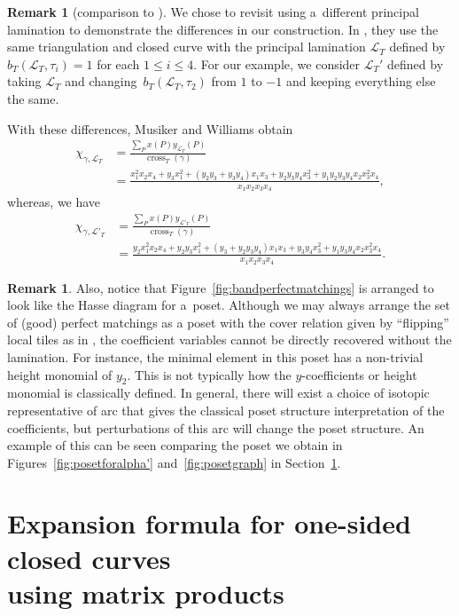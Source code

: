 \documentclass[pdftex]{sigma}
\numberwithin{equation}{section}
\theoremstyle{definition}
\newtheorem{Remark}[Theorem]{Remark}
\begin{document}
\begin{Remark}[{comparison to \cite[Example~3.23]{MW13}}] We chose to revisit \cite[Example 3.23]{MW13} using a~different principal lamination to demonstrate the differences in our construction. In \cite{MW13}, they use the same triangulation and closed curve with the principal lamination $\mathcal{L}_T$ defined by~$b_T(\mathcal{L}_T, \tau_{i})=1$ for each $1\leq i\leq 4$. For our example, we consider $\mathcal{L}_T'$ defined by taking $\mathcal{L}_T$ and changing~$b_T(\mathcal{L}_T, \tau_2)$ from $1$ to $-1$ and keeping everything else the same.

With these differences, Musiker and Williams obtain
\begin{align*}
\chi_{\gamma, \mathcal{L}_T}&=\frac{\sum_P x(P)y_{\mathcal{L}_T}(P)}{\operatorname{cross}_T(\gamma)}\\
&=\frac{x_1^2x_2x_4+y_3x_1^2+(y_2y_3+y_3y_4)x_1x_3+y_2y_3y_4x_3^2+y_1y_2y_3y_4x_2x_3^2x_4}{x_1x_2x_3x_4},\end{align*}
whereas, we have
\begin{align*}
\chi_{\gamma, \mathcal{L'}_T}&=\frac{\sum_P x(P)y_{\mathcal{L'}_T}(P)}{\operatorname{cross}_T(\gamma)}\\
&=\frac{y_2x_1^2x_2x_4+y_2y_3x_1^2+(y_3+y_2y_3y_4)x_1x_3+y_3y_4x_3^2+y_1y_3y_4x_2x_3^2x_4}{x_1x_2x_3x_4}.\end{align*}
\end{Remark}

\begin{Remark}
Also, notice that Figure~\ref{fig:bandperfectmatchings} is arranged to look like the Hasse diagram for a~poset. Although we may always arrange the set of (good) perfect matchings as a poset with the cover relation given by ``flipping'' local tiles as in \cite{MSW11}, the coefficient variables cannot be directly recovered without the lamination. For instance, the minimal element in this poset has a non-trivial height monomial of $y_2$. This is not typically how the $y$-coefficients or height monomial is classically defined. In general, there will exist a choice of isotopic representative of arc that gives the classical poset structure interpretation of the coefficients, but perturbations of this arc will change the poset structure. An example of this can be seen comparing the poset we obtain in Figures~\ref{fig:posetforalpha'} and~\ref{fig:posetgraph} in Section~\ref{section:expansionformulanonorientable}.
\end{Remark}

\section[Expansion formula for one-sided closed curves using matrix products]{Expansion formula for one-sided closed curves\\ using matrix products}\label{section:expansionformulanonorientable}
\end{document}
